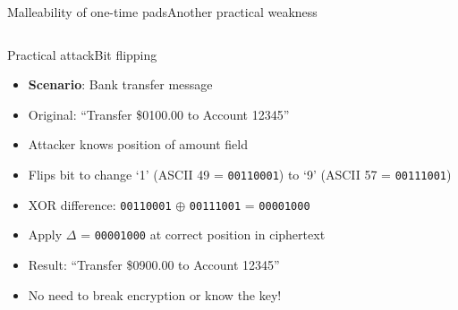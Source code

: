 \documentclass[aspectratio=169, lualatex, handout]{beamer}
\begin{document}
\begin{frame}{Malleability of one-time pads}{Another practical weakness}
	\begin{columns}[c]
	\end{columns}
\end{frame}

\begin{frame}{Practical attack}{Bit flipping}
	\begin{itemize}[<+->]
		\item \textbf{Scenario}: Bank transfer message
		\item Original: ``Transfer \$0100.00 to Account 12345''
		\item Attacker knows position of amount field
		\item Flips bit to change `1' (ASCII 49 = \texttt{00110001}) to `9' (ASCII 57 = \texttt{00111001})
		\item XOR difference: \texttt{00110001} $\oplus$ \texttt{00111001} = \texttt{00001000}
		\item Apply $\Delta$ = \texttt{00001000} at correct position in ciphertext
		\item Result: ``Transfer \$0900.00 to Account 12345''
		\item \alert{No need to break encryption or know the key!}
	\end{itemize}
\end{frame}
\end{document}
